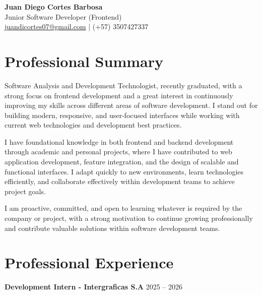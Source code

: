 \documentclass[11pt,a4paper]{article}
\begin{document}
\begin{center}
    {\LARGE \textbf{Juan Diego Cortes Barbosa}}\\[5pt]
    Junior Software Developer (Frontend)\\[5pt]
    \href{mailto:juandicortes07@gmail.com}{juandicortes07@gmail.com} \quad | \quad (+57) 3507427337
\end{center}

\vspace{0.5cm}

\section*{Professional Summary}

Software Analysis and Development Technologist, recently graduated, with a strong focus on frontend development and a great interest in continuously improving my skills across different areas of software development. I stand out for building modern, responsive, and user-focused interfaces while working with current web technologies and development best practices.

I have foundational knowledge in both frontend and backend development through academic and personal projects, where I have contributed to web application development, feature integration, and the design of scalable and functional interfaces. I adapt quickly to new environments, learn technologies efficiently, and collaborate effectively within development teams to achieve project goals.

I am proactive, committed, and open to learning whatever is required by the company or project, with a strong motivation to continue growing professionally and contribute valuable solutions within software development teams.

\section*{Professional Experience}

\textbf{Development Intern - Intergraficas S.A} \hfill 2025 -- 2026
\end{document}
